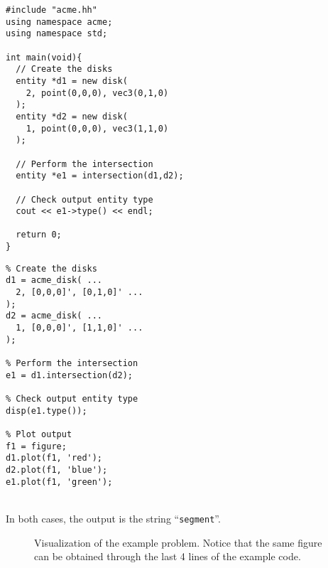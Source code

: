 \begin{minipage}[t]{0.475\textwidth}
\cpp{}
\begin{verbatim}
#include "acme.hh"
using namespace acme;
using namespace std;

int main(void){
  // Create the disks
  entity *d1 = new disk(
    2, point(0,0,0), vec3(0,1,0)
  );
  entity *d2 = new disk(
    1, point(0,0,0), vec3(1,1,0)
  );

  // Perform the intersection
  entity *e1 = intersection(d1,d2);

  // Check output entity type
  cout << e1->type() << endl;

  return 0;
}
\end{verbatim}
\end{minipage}
\hfill
\begin{minipage}[t]{0.475\textwidth}
\Matlab{}
\begin{verbatim}
% Create the disks
d1 = acme_disk( ...
  2, [0,0,0]', [0,1,0]' ...
);
d2 = acme_disk( ...
  1, [0,0,0]', [1,1,0]' ...
);

% Perform the intersection
e1 = d1.intersection(d2);

% Check output entity type
disp(e1.type());

% Plot output
f1 = figure;
d1.plot(f1, 'red');
d2.plot(f1, 'blue');
e1.plot(f1, 'green');
\end{verbatim}
\end{minipage} \\[0.5em]

In both cases, the output is the string ``\texttt{segment}''.

\begin{figure}[!ht]
  \centering
  \caption[Visualization of the example problem.]{Visualization of the example problem. Notice that the same figure can be obtained through the last 4 lines of the \Matlab{} example code.}
  \label{app1:fig:acme_example}
\end{figure}


